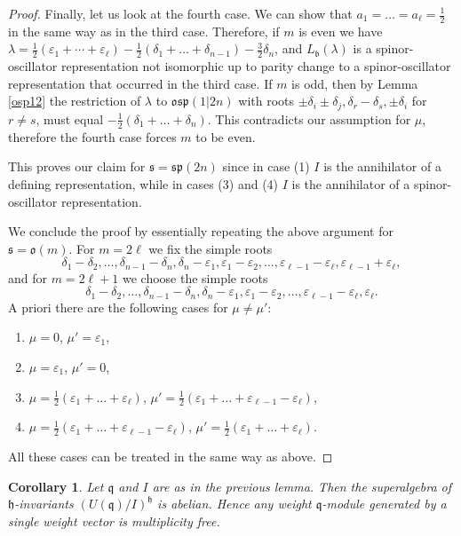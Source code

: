 \documentclass[12pt]{amsart}
\makeatletter
\def\@putname#1#2#3#4{\def\@@ref{#3}\let\old@bf\bf
        \def\bf##1{\old@bf\if?\noexpand##1?{#4}\else##1\fi}%
	#1{#2}%
        \let\bf\old@bf}
\def\@putname#1#2#3#4{\def\@@ref{#3}\let\old@bf\bf	%
	\let\old@reset@font\reset@font			%
        \def\bf##1{\old@bf\if?\noexpand##1?{#4}\else##1\fi}%
	\def\reset@font##1##2{\old@reset@font##1\if?\noexpand##2?{#4}\else##2\fi}#1{#2}%
        \let\bf\old@bf\let\reset@font\old@reset@font}
\let\my@ref=\ref
\def\ref#1{\@putname\my@ref{#1}{#1}{\tiny\rm\@@ref}}
\theoremstyle{plain} %
\numberwithin{equation}{section}
\theoremstyle{definition}
\theoremstyle{remark}
\theoremstyle{plain} %
\newtheorem{corollary}[definition]{Corollary}
\renewcommand{\sp}{\mathfrak{sp}}
\newcommand{\gs}{\mathfrak{s}}
\newcommand{\gh}{\mathfrak{h}}
\def\gb{\mathfrak{b}}
\def\gh{\mathfrak{h}}
\def\gq{\mathfrak{q}}
\def\gs{\mathfrak{s}}
\makeatother
\begin{document}
\begin{proof}
  Finally, let us look at the fourth case. We can show that $a_1=\dots=a_\ell=\frac{1}{2}$ in the same way as in the third case. Therefore, if $m$ is even we have $\lambda = \frac{1}{2} \left(\varepsilon_1+\cdots +\varepsilon_\ell\right)  -\frac{1}{2}(\delta_1+\dots+\delta_{n-1})-\frac{3}{2}\delta_n$, and 
   $L_{\gb}(\lambda)$ is a spinor-oscillator representation not isomorphic up to parity change to a spinor-oscillator representation that occurred in the third case. 
  If $m$ is odd, then by Lemma \ref{osp12} the restriction of  $\lambda$  to $\mathfrak{osp}(1|2n)$ with roots $\pm \delta_i \pm \delta_j, \delta_r - \delta_s, \pm \delta_i$ for $r \neq s$,
     must equal $-\frac{1}{2}(\delta_1+\dots+\delta_{n})$. This contradicts our assumption for $\mu$,  therefore the fourth case forces $m$ to be even. 
  
  This proves our claim for $\mathfrak s = \sp (2n)$ since in case (1) $I$ is the annihilator of a defining representation, while in cases (3) and (4) $I$ is the annihilator of a spinor-oscillator representation.
  
We conclude the proof by essentially repeating the above argument  for $\gs=\mathfrak{o}(m)$.
For  $m=2\ell$ we fix the simple roots
  $$\delta_1-\delta_2,\dots,\delta_{n-1}-\delta_n,\delta_n-\varepsilon_1,\varepsilon_1-\varepsilon_2,\dots,\varepsilon_{\ell-1}-\varepsilon_\ell,\varepsilon_{\ell-1}+\varepsilon_\ell,$$
and for $m=2\ell+1$ we choose  the simple roots
 $$\delta_1-\delta_2,\dots,\delta_{n-1}-\delta_n,\delta_n-\varepsilon_1,\varepsilon_1-\varepsilon_2,\dots,\varepsilon_{\ell-1}-\varepsilon_\ell,\varepsilon_\ell.$$
A priori there are the following cases for $\mu \neq \mu'$:
 \begin{enumerate}
  \item $\mu=0$, $\mu'=\varepsilon_1$,
    \item $\mu=\varepsilon_1$, $\mu'=0$,
\item $\mu=\frac{1}{2}(\varepsilon_1+\dots+\varepsilon_{\ell})$, $\mu'=\frac{1}{2}(\varepsilon_1+\dots+\varepsilon_{\ell-1}-\varepsilon_{\ell})$,
\item  $\mu=\frac{1}{2}(\varepsilon_1+\dots+\varepsilon_{\ell-1}-\varepsilon_{\ell})$, $\mu'=\frac{1}{2}(\varepsilon_1+\dots+\varepsilon_{\ell})$.
\end{enumerate}
All these cases can be treated in the same way as above.  \end{proof}

  \begin{corollary} Let  $\gq$ and $I$ are as in the previous lemma. Then the superalgebra of $\gh$-invariants $\left(U(\gq)/I\right)^{\gh}$ is abelian. Hence any weight $\gq$-module generated by a single weight vector is multiplicity free.
  \end{corollary}
\end{document}
